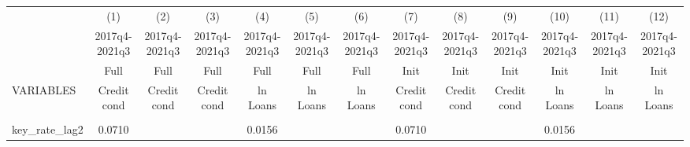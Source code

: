 \documentclass[]{article}
\begin{document}
\begin{center}
\begin{tabular}{lcccccccccccc} \hline
 & (1) & (2) & (3) & (4) & (5) & (6) & (7) & (8) & (9) & (10) & (11) & (12) \\
 & 2017q4-2021q3 & 2017q4-2021q3 & 2017q4-2021q3 & 2017q4-2021q3 & 2017q4-2021q3 & 2017q4-2021q3 & 2017q4-2021q3 & 2017q4-2021q3 & 2017q4-2021q3 & 2017q4-2021q3 & 2017q4-2021q3 & 2017q4-2021q3 \\
 & Full & Full & Full & Full & Full & Full & Init & Init & Init & Init & Init & Init \\
VARIABLES & Credit cond & Credit cond & Credit cond & ln Loans & ln Loans & ln Loans & Credit cond & Credit cond & Credit cond & ln Loans & ln Loans & ln Loans \\ \hline
\vspace{4pt} & \begin{footnotesize}\end{footnotesize} & \begin{footnotesize}\end{footnotesize} & \begin{footnotesize}\end{footnotesize} & \begin{footnotesize}\end{footnotesize} & \begin{footnotesize}\end{footnotesize} & \begin{footnotesize}\end{footnotesize} & \begin{footnotesize}\end{footnotesize} & \begin{footnotesize}\end{footnotesize} & \begin{footnotesize}\end{footnotesize} & \begin{footnotesize}\end{footnotesize} & \begin{footnotesize}\end{footnotesize} & \begin{footnotesize}\end{footnotesize} \\
key\_rate\_lag2 & 0.0710 &  &  & 0.0156 &  &  & 0.0710 &  &  & 0.0156 &  &  \\

\end{tabular}
\end{center}
\end{document}
